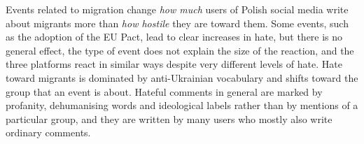 \documentclass[11pt]{article}
\begin{document}
Events related to migration change \emph{how much} users of Polish social media write about migrants more than \emph{how hostile} they are toward them. Some events, such as the adoption of the EU Pact, lead to clear increases in hate, but there is no general effect, the type of event does not explain the size of the reaction, and the three platforms react in similar ways despite very different levels of hate. Hate toward migrants is dominated by anti-Ukrainian vocabulary and shifts toward the group that an event is about. Hateful comments in general are marked by profanity, dehumanising words and ideological labels rather than by mentions of a particular group, and they are written by many users who mostly also write ordinary comments.



\end{document}

